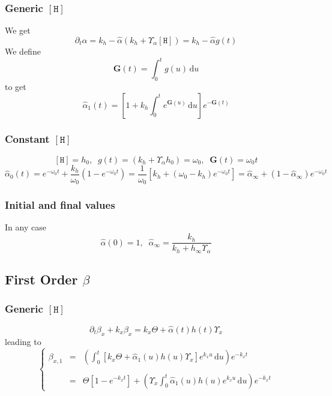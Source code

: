 \documentclass[aps,onecolumn,12pt]{revtex4}
\newcommand{\mychem}[1]{\mathtt{#1}}
\newcommand{\myconc}[1]{\left\lbrack{#1}\right\rbrack}
\newcommand{\spproton}{\mychem{H}}
\newcommand{\proton}{\myconc{\spproton}}
\newcommand{\ig}{\ensuremath{\mathbf{G}}}
\begin{document}
\subsubsection{Generic $\proton$}
We get
\begin{equation}
	\partial_t \hat\alpha = k_h - \hat\alpha\left( k_h+ \Upsilon_\alpha \proton \right) = k_h - \hat\alpha g(t)
\end{equation}
We define
\begin{equation}
	\ig(t) = \int_0^t g(u) \,\mathrm{d} u
\end{equation}
to get
\begin{equation}
	\hat \alpha_1(t) = \left[ 1 + k_h \int_0^t e^{\ig(u)}  \,\mathrm{d} u \right] e^{-\ig(t)}
\end{equation}
\subsubsection{Constant $\proton$}
\begin{equation}
	\proton=h_0,\;\;g(t) = (k_h+\Upsilon_\alpha h_0)=\omega_0,\;\;\ig(t) = \omega_0 t
\end{equation}
\begin{equation}
	\hat\alpha_0(t) = e^{-\omega_0t} + \dfrac{k_h}{\omega_0}\left( 1 - e^{-\omega_0 t}\right) 
	= \dfrac{1}{\omega_0} \left[k_h + \left(\omega_0-k_h\right) e^{-\omega_0 t} \right] = \hat\alpha_\infty + \left(1-\hat\alpha_\infty\right) e^{-\omega_0 t}
\end{equation}

\subsubsection{Initial and final values}
In any case
\begin{equation}
	\hat\alpha(0) = 1, \;\; \hat\alpha_\infty = \dfrac{k_h}{k_h+h_\infty\Upsilon_\alpha}
\end{equation}


\subsection{First Order $\beta$}
\subsubsection{Generic $\proton$}
\begin{equation}
\partial_t\beta_x + k_x \beta_x = k_x\Theta + \hat{\alpha}(t)h(t) \Upsilon_x
\end{equation}
leading to
\begin{equation}
\left\lbrace
\begin{array}{rcl}
\beta_{x,1} & = & \displaystyle \left( \int_0^t \left[k_x\Theta + \hat{\alpha}_1(u)h(u) \Upsilon_x \right]e^{k_xu}\,\mathrm{d}u \right) e^{-k_x t}\\
\\
 & = & \displaystyle \Theta \left[1-e^{-k_xt}\right] + \left(\Upsilon_x \int_0^t \hat{\alpha}_1(u)h(u) e^{k_xu}\,\mathrm{d}u \right)  e^{-k_x t}
\end{array}
\right.
\end{equation}
\end{document}
